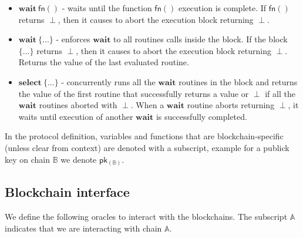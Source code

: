 \documentclass{article}      	%
\begin{document}
\begin{itemize}[nosep, noitemsep]
    \item $\mathbf{wait} \: \mathsf{fn}()$ - waits until the function $\mathsf{fn}()$ execution is complete. If $\mathsf{fn}()$ returns $\perp$, then it causes to abort the execution block returning $\perp$. \\
    \item $\mathbf{wait} \: \{...\}$ - enforces $\mathbf{wait}$ to all routines calls inside the block. If the block $\{...\}$ returns $\perp$, then it causes to abort the execution block returning $\perp$. Returns the value of the last evaluated routine. \\
    \item $\mathbf{select} \: \{...\}$ - concurrently runs all the $\mathbf{wait}$ routines in the block and returns the value of the first routine that successfully returns a value or $\perp$ if all the $\mathbf{wait}$ routines aborted with $\perp$. When a $\mathbf{wait}$ routine aborts returning $\perp$, it waits until execution of another $\mathbf{wait}$ is successfully completed. \\
\end{itemize}

In the protocol definition, variables and functions that are blockchain-specific (unless clear from context) are denoted with a subscript, example for a publick key on chain $\mathbb{B}$ we denote $\mathsf{pk_{(\mathbb{B})}}$. \\


\subsection{Blockchain interface}

We define the following oracles to interact with the blockchains. The subscript $\mathbb{A}$ indicates that we are interacting with chain $\mathbb{A}$.
\end{document}
